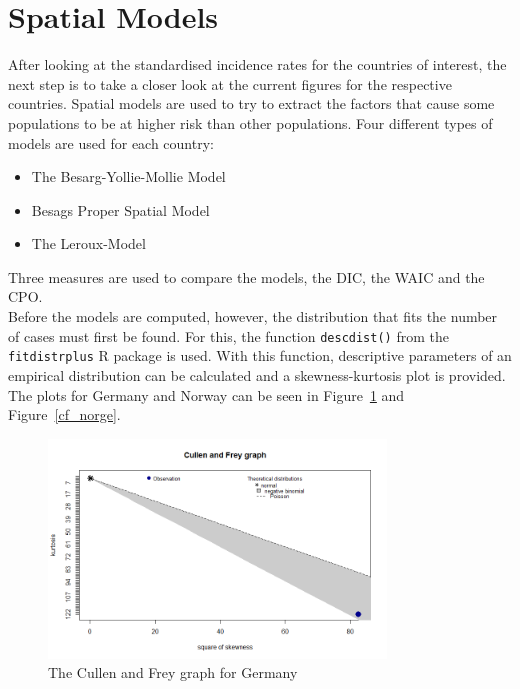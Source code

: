 \section{Spatial Models}
After looking at the standardised incidence rates for the countries of interest, the next step is to take a closer look at the current figures for the respective countries. Spatial models are used to try to extract the factors that cause some populations to be at higher risk than other populations. Four different types of models are used for each country:
\begin{itemize}
    \item[1.] The Besarg-Yollie-Mollie Model
    \item[2.] Besags Proper Spatial Model
    \item[3.] The Leroux-Model
\end{itemize}
Three measures are used to compare the models, the DIC, the WAIC and the CPO. \\
Before the models are computed, however, the distribution that fits the number of cases must first be found. For this, the function \texttt{descdist()} from the \texttt{fitdistrplus} R package is used. With this function, descriptive parameters of an empirical distribution can be calculated and a skewness-kurtosis plot is provided. The plots for Germany and Norway can be seen in Figure~\ref{cf_germany} and Figure~\ref{cf_norge}.
%     
\begin{figure}[H]
    \centering
    \includegraphics[width = 0.8\textwidth]{cf-germany.png}
    \caption{The Cullen and Frey graph for Germany}
    \label{cf_germany}
\end{figure}
